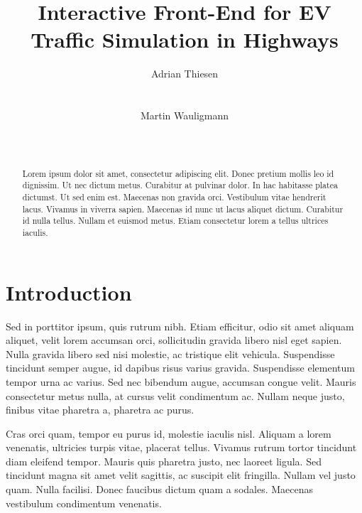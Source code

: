 \documentclass{sig-alternate}
\begin{document}
\title{Interactive Front-End for EV Traffic Simulation in Highways}


\author{
\alignauthor Adrian Thiesen\\
       \\
       \\
\alignauthor Martin Wauligmann\\
       \\
       \\
}


\maketitle


\begin{abstract}
Lorem ipsum dolor sit amet, consectetur adipiscing elit. Donec pretium mollis leo id dignissim. Ut nec dictum metus. Curabitur at pulvinar dolor. In hac habitasse platea dictumst. Ut sed enim est. Maecenas non gravida orci. Vestibulum vitae hendrerit lacus. Vivamus in viverra sapien. Maecenas id nunc ut lacus aliquet dictum. Curabitur id nulla tellus. Nullam et euismod metus. Etiam consectetur lorem a tellus ultrices iaculis.
\end{abstract}


\section{Introduction}
Sed in porttitor ipsum, quis rutrum nibh. Etiam efficitur, odio sit amet aliquam aliquet, velit lorem accumsan orci, sollicitudin gravida libero nisl eget sapien. Nulla gravida libero sed nisi molestie, ac tristique elit vehicula. Suspendisse tincidunt semper augue, id dapibus risus varius gravida. Suspendisse elementum tempor urna ac varius. Sed nec bibendum augue, accumsan congue velit. Mauris consectetur metus nulla, at cursus velit condimentum ac. Nullam neque justo, finibus vitae pharetra a, pharetra ac purus.

Cras orci quam, tempor eu purus id, molestie iaculis nisl. Aliquam a lorem venenatis, ultricies turpis vitae, placerat tellus. Vivamus rutrum tortor tincidunt diam eleifend tempor. Mauris quis pharetra justo, nec laoreet ligula. Sed tincidunt magna sit amet velit sagittis, ac suscipit elit fringilla. Nullam vel justo quam. Nulla facilisi. Donec faucibus dictum quam a sodales. Maecenas vestibulum condimentum venenatis.
\end{document}
